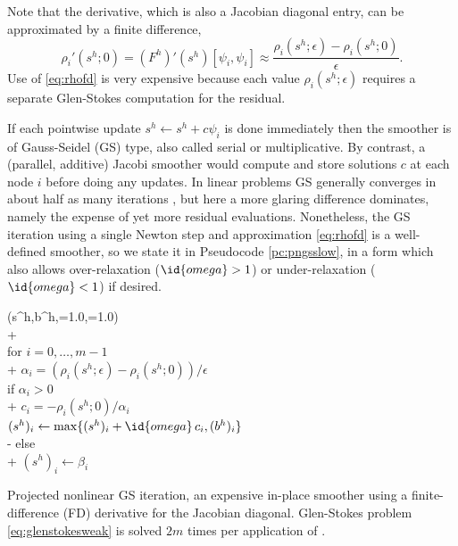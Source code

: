 \documentclass[letterpaper,final,12pt,reqno]{amsart}
\theoremstyle{claim}
\newcommand{\eps}{\epsilon}
\numberwithin{equation}{section}
\numberwithin{figure}{section}
\numberwithin{table}{section}
\numberwithin{theorem}{section}
\begin{document}
Note that the derivative, which is also a Jacobian diagonal entry, can be approximated by a finite difference,
\begin{equation}
\rho_i'(s^h; 0) = (F^h)'(s^h)[\psi_i,\psi_i] \approx \frac{\rho_i(s^h; \eps) - \rho_i(s^h; 0)}{\eps}.  \label{eq:rhofd}
\end{equation}
Use of \eqref{eq:rhofd} is very expensive because each value $\rho_i(s^h; \eps)$ requires a separate Glen-Stokes computation for the residual.

If each pointwise update $s^h \gets s^h + c \psi_i$ is done immediately then the smoother is of Gauss-Seidel (GS) type, also called serial or multiplicative.  By contrast, a (parallel, additive) Jacobi smoother would compute and store solutions $c$ at each node $i$ before doing any updates.  In linear problems GS generally converges in about half as many iterations \cite{Greenbaum1997}, but here a more glaring difference dominates, namely the expense of yet more residual evaluations.  Nonetheless, the GS iteration using a single Newton step and approximation \eqref{eq:rhofd} is a well-defined smoother, so we state it in Pseudocode \ref{pc:pngsslow}, in a form which also allows over-relaxation ($\id{omega} > 1$) or under-relaxation ($\id{omega} < 1$) if desired.

\begin{pcode}[ht]
\begin{pseudo*}
(s^h,b^h,=1.0,=1.0)\text{:} \\+
     \\
    for $i = 0,\dots,m-1$ \\+
        $\alpha_i = (\rho_i(s^h; \eps) - \rho_i(s^h; 0))/\eps$  \qquad\qquad {} \\
        if $\alpha_i > 0$ \\+
            $c_i = - \rho_i(s^h; 0) / \alpha_i$ \\
            $(s^h)_i \gets \max\{(s^h)_i + \id{omega}\,c_i, (b^h)_i\}$ \\-
        else \\+
            $(s^h)_i \gets \beta_i$ \qquad\qquad {}
\end{pseudo*}
\caption{Projected nonlinear GS iteration, an expensive in-place smoother using a finite-difference (FD) derivative for the Jacobian diagonal.  Glen-Stokes problem \eqref{eq:glenstokesweak} is solved $2m$ times per application of .}
\label{pc:pngsslow}
\end{pcode}
\end{document}
